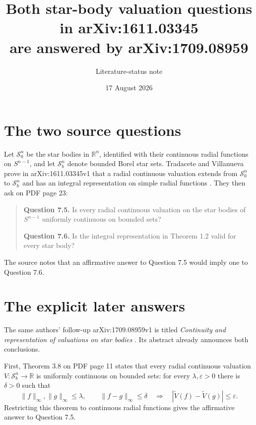 \documentclass[11pt]{article}
\title{Both star-body valuation questions in arXiv:1611.03345\\
are answered by arXiv:1709.08959}
\author{Literature-status note}
\date{17 August 2026}
\newcommand{\R}{\mathbb R}
\newcommand{\Szero}{\mathcal S_0^n}
\newcommand{\Sb}{\mathcal S_b^n}
\begin{document}
\maketitle

\begin{center}
\end{center}

\section{The two source questions}

Let $\Szero$ be the star bodies in $\R^n$, identified with their continuous
radial functions on $S^{n-1}$, and let $\Sb$ denote bounded Borel star sets.
Tradacete and Villanueva prove in arXiv:1611.03345v1 that a radial continuous
valuation extends from $\Szero$ to $\Sb$ and has an integral representation on
simple radial functions \cite{TV1}.  They then ask on PDF page 23:

\begin{quote}
\textbf{Question 7.5.} Is every radial continuous valuation on the star bodies
of $S^{n-1}$ uniformly continuous on bounded sets?

\textbf{Question 7.6.} Is the integral representation in Theorem 1.2 valid for
every star body?
\end{quote}

The source notes that an affirmative answer to Question 7.5 would imply one to
Question 7.6.

\section{The explicit later answers}

The same authors' follow-up arXiv:1709.08959v1 is titled
\emph{Continuity and representation of valuations on star bodies}
\cite{TV2}.  Its abstract already announces both conclusions.

First, Theorem 3.8 on PDF page 11 states that every radial continuous
valuation $V:\Sb\to\R$ is uniformly continuous on bounded sets: for every
$\lambda,\varepsilon>0$ there is $\delta>0$ such that
\[
 \|f\|_\infty,\|g\|_\infty\leq\lambda,
 \qquad \|f-g\|_\infty\leq\delta
 \quad\Longrightarrow\quad
 |\widetilde V(f)-\widetilde V(g)|\leq\varepsilon.
\]
Restricting this theorem to continuous radial functions gives the affirmative
answer to Question 7.5.
\end{document}
